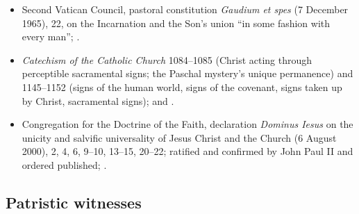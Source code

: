 {\fontsize{8.6}{9.6}\selectfont
\begin{itemize}[itemsep=0pt,parsep=0pt,topsep=0.05em]
\item Second Vatican Council, pastoral constitution \emph{Gaudium et spes} (7 December 1965), 22, on the Incarnation and the Son's union ``in some fashion with every man''; .
\item \emph{Catechism of the Catholic Church} 1084--1085 (Christ acting through perceptible sacramental signs; the Paschal mystery's unique permanence) and 1145--1152 (signs of the human world, signs of the covenant, signs taken up by Christ, sacramental signs);  and .
\item Congregation for the Doctrine of the Faith, declaration \emph{Dominus Iesus} on the unicity and salvific universality of Jesus Christ and the Church (6 August 2000), 2, 4, 6, 9--10, 13--15, 20--22; ratified and confirmed by John Paul II and ordered published; .
\end{itemize}}

\subsection*{Patristic witnesses}

